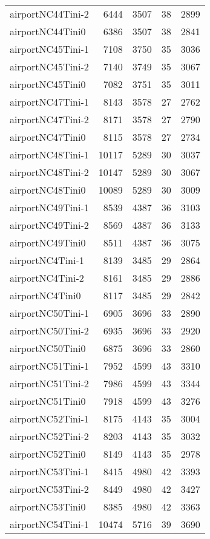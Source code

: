 \begin{longtable}{lrrrr}
airportNC44Tini-2 & 6444 & 3507 & 38 & 2899 \\
airportNC44Tini0 & 6386 & 3507 & 38 & 2841 \\
airportNC45Tini-1 & 7108 & 3750 & 35 & 3036 \\
airportNC45Tini-2 & 7140 & 3749 & 35 & 3067 \\
airportNC45Tini0 & 7082 & 3751 & 35 & 3011 \\
airportNC47Tini-1 & 8143 & 3578 & 27 & 2762 \\
airportNC47Tini-2 & 8171 & 3578 & 27 & 2790 \\
airportNC47Tini0 & 8115 & 3578 & 27 & 2734 \\
airportNC48Tini-1 & 10117 & 5289 & 30 & 3037 \\
airportNC48Tini-2 & 10147 & 5289 & 30 & 3067 \\
airportNC48Tini0 & 10089 & 5289 & 30 & 3009 \\
airportNC49Tini-1 & 8539 & 4387 & 36 & 3103 \\
airportNC49Tini-2 & 8569 & 4387 & 36 & 3133 \\
airportNC49Tini0 & 8511 & 4387 & 36 & 3075 \\
airportNC4Tini-1 & 8139 & 3485 & 29 & 2864 \\
airportNC4Tini-2 & 8161 & 3485 & 29 & 2886 \\
airportNC4Tini0 & 8117 & 3485 & 29 & 2842 \\
airportNC50Tini-1 & 6905 & 3696 & 33 & 2890 \\
airportNC50Tini-2 & 6935 & 3696 & 33 & 2920 \\
airportNC50Tini0 & 6875 & 3696 & 33 & 2860 \\
airportNC51Tini-1 & 7952 & 4599 & 43 & 3310 \\
airportNC51Tini-2 & 7986 & 4599 & 43 & 3344 \\
airportNC51Tini0 & 7918 & 4599 & 43 & 3276 \\
airportNC52Tini-1 & 8175 & 4143 & 35 & 3004 \\
airportNC52Tini-2 & 8203 & 4143 & 35 & 3032 \\
airportNC52Tini0 & 8149 & 4143 & 35 & 2978 \\
airportNC53Tini-1 & 8415 & 4980 & 42 & 3393 \\
airportNC53Tini-2 & 8449 & 4980 & 42 & 3427 \\
airportNC53Tini0 & 8385 & 4980 & 42 & 3363 \\
airportNC54Tini-1 & 10474 & 5716 & 39 & 3690 \\

\end{longtable}
